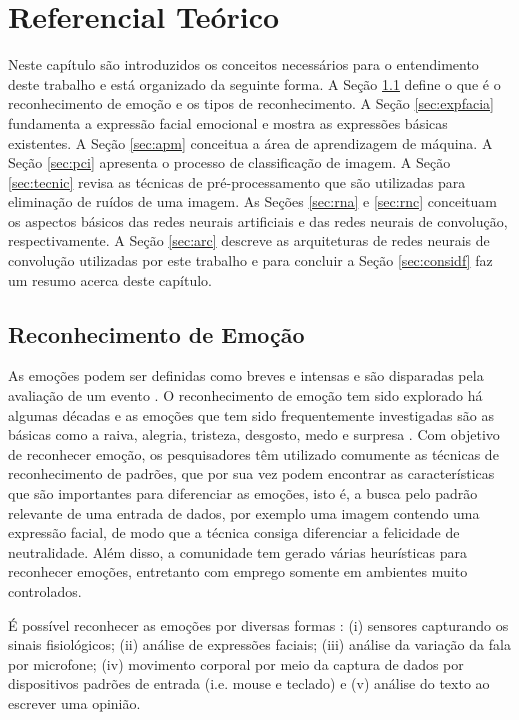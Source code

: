 \chapter{Referencial Teórico}\label{sec:conceitos}
Neste capítulo são introduzidos os conceitos necessários para o entendimento deste trabalho e está organizado da seguinte forma. A Seção \ref{sec:recemo} define o que é o reconhecimento de emoção e os tipos de reconhecimento. A Seção \ref{sec:expfacia} fundamenta a expressão facial emocional e mostra as expressões básicas existentes. A Seção \ref{sec:apm} conceitua a área de aprendizagem de máquina. A Seção \ref{sec:pci} apresenta o processo de classificação de imagem. A Seção \ref{sec:tecnic} revisa as técnicas de pré-processamento que são utilizadas para eliminação de ruídos de uma imagem. As Seções \ref{sec:rna} e \ref{sec:rnc} conceituam os aspectos básicos das redes neurais artificiais e das redes neurais de convolução, respectivamente. A Seção \ref{sec:arc} descreve as arquiteturas de redes neurais de convolução utilizadas por este trabalho e para concluir a Seção \ref{sec:considf} faz um resumo acerca deste capítulo.   

\section{Reconhecimento de Emoção}\label{sec:recemo}
As emoções podem ser definidas como breves e intensas e são disparadas pela avaliação de um evento \citep{scherer2000psychological}. O reconhecimento de emoção tem sido explorado há algumas décadas e as emoções que tem sido frequentemente investigadas são as básicas como a raiva, alegria, tristeza, desgosto, medo e surpresa \citep{ekman1994}. Com objetivo de reconhecer emoção, os pesquisadores têm utilizado comumente as técnicas de reconhecimento de padrões, que por sua vez podem encontrar as características que são importantes para diferenciar as emoções, isto é, a busca pelo padrão relevante de uma entrada de dados, por exemplo uma imagem contendo uma expressão facial, de modo que a técnica consiga diferenciar a felicidade de neutralidade. Além disso, a comunidade tem gerado várias heurísticas para reconhecer emoções, entretanto com emprego somente em ambientes muito controlados. 

É possível reconhecer as emoções por diversas formas \citep{nasoz2004emotion}: (i) sensores capturando os sinais fisiológicos; (ii) análise de expressões faciais; (iii) análise da variação da fala por microfone; (iv) movimento corporal por meio da captura de dados por dispositivos padrões de entrada (i.e. mouse e teclado) e (v) análise do texto ao escrever uma opinião.

